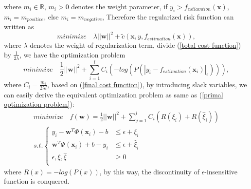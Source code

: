 \documentclass[12pt, draftclsnofoot, onecolumn]{IEEEtran}
\begin{document}
\begin{spacing}{2}
\begin{equation}
\label{cost function}
\end{equation}
where $m_{i}\in \mathbb{R}$, $m_{i}>0$ denotes the weight parameter, if $y_{i}>f_{estiamtion}(\mathbf{x})$, $m_{i}=m_{positive}$, else $m_{i}=m_{negative}$, Therefore the regularized risk function can written as 
\begin{equation}
minimize\quad \lambda||\mathbf{w}||^{2}+\tilde{c}(\mathbf{x}, y, f_{estimation}(\mathbf{x})),
\label{total cost function}
\end{equation} 
where $\lambda$ denotes the weight of regularization term, divide (\ref{total cost function}) by $\frac{1}{2\lambda}$, we have the optimization problem  
\begin{equation}
minimize \quad \frac{1}{2}||\mathbf{w}||^{2}+\sum_{i=1}^{l}C_{i}(-log(P(|y_{i}-f_{estimation}(\mathbf{x}_{i})|_{\epsilon}))),
\label{final cost function}
\end{equation}
where $C_{i}=\frac{m_{i}}{2\lambda l}$, based on (\ref{final cost function}), by introducing slack variables, we can easily derive the equivalent optimization problem as same as (\ref{primal optimization problem}):
\begin{eqnarray}
\nonumber
minimize \quad f(\mathbf{w})=\frac{1}{2}||\mathbf{w}||^{2}+\sum_{j=1}^{l}C_{i}(R(\xi_{i})+R(\hat{\xi}_{i}))\\
s.t. \left\{\begin{array}{ll}
y_{i}-\mathbf{w}^{T}\Phi(\mathbf{x}_{i})-b &\leq \epsilon+\xi_{i}\\
\mathbf{w}^{T}\Phi(\mathbf{x}_{i})+b-y_{i} &\leq \epsilon+\hat{\xi}_{i}\\
\epsilon, \xi,\hat{\xi} &\geq 0\\
\end{array}\right.
\label{primal objective function}
\end{eqnarray}
where $R(x)=-log(P(x))$, by this way, the discontinuity of $\epsilon$-insensitive function is conquered. 

\end{spacing}
\end{document}

